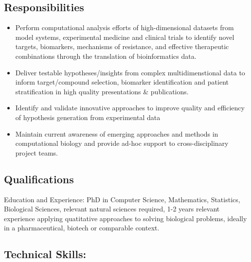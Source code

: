 \documentclass[letterpaper]{scrartcl}
\begin{document}
\subsection{Responsibilities}\label{responsibilities}

\begin{itemize}
\itemsep1pt\parskip0pt
\item
  Perform computational analysis efforts of high-dimensional datasets
  from model systems, experimental medicine and clinical trials to
  identify novel targets, biomarkers, mechanisms of resistance, and
  effective therapeutic combinations through the translation of
  bioinformatics data.
\item
  Deliver testable hypotheses/insights from complex multidimenstional
  data to inform target/compound selection, biomarker identification and
  patient stratification in high quality presentations \& publications.
\item
  Identify and validate innovative approaches to improve quality and
  efficiency of hypothesis generation from experimental data\\
\item
  Maintain current awareness of emerging approaches and methods in
  computational biology and provide ad-hoc support to cross-disciplinary
  project teams.
\end{itemize}

\subsection{Qualifications}\label{qualifications}

Education and Experience: PhD in Computer Science, Mathematics,
Statistics, Biological Sciences, relevant natural sciences required, 1-2
years relevant experience applying quatitative approaches to solving
biological problems, ideally in a pharmaceutical, biotech or comparable
context.

\subsection{Technical Skills:}\label{technical-skills}
\end{document}
